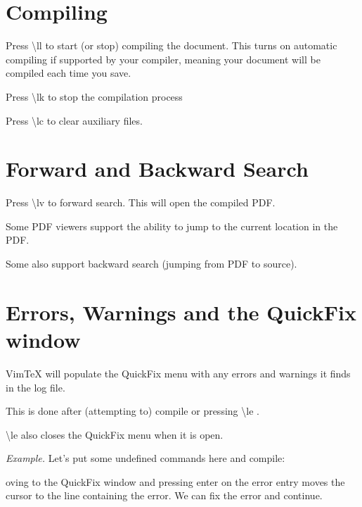 \documentclass{article}
\newcommand{\lk}{\textbackslash{}lk }
\newcommand{\lv}{\textbackslash{}lv }
\newcommand{\lc}{\textbackslash{}lc }
\renewcommand{\ll}{\textbackslash{}ll }
\renewcommand{\le}{\textbackslash{}le }
\begin{document}
\section{Compiling}

Press \ll to start (or stop) compiling the document.
This turns on automatic compiling if supported by your compiler, meaning your
document will be compiled each time you save.

Press \lk to stop the compilation process

Press \lc to clear auxiliary files.














\section{Forward and Backward Search}

Press \lv to forward search. This will open the compiled PDF.

Some PDF viewers support the ability to jump to the current location in the PDF.

Some also support backward search (jumping from PDF to source).
















\section{Errors, Warnings and the QuickFix window}

VimTeX will populate the QuickFix menu with any errors and warnings it finds in
the log file.

This is done after (attempting to) compile or pressing \le.

\le also closes the QuickFix menu when it is open.

\emph{Example.} Let's put some undefined commands here and compile:

oving to the QuickFix window and pressing enter on the error entry moves the
cursor to the line containing the error. We can fix the error and continue.
\end{document}
